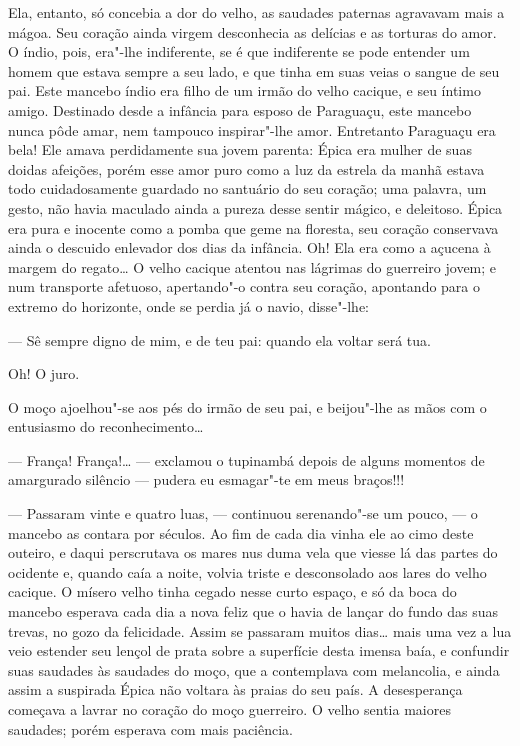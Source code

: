 Ela, entanto, só concebia a dor do velho, as saudades paternas agravavam
mais a mágoa. Seu coração ainda virgem desconhecia as delícias e as
torturas do amor. O índio, pois, era"-lhe indiferente, se é que
indiferente se pode entender um homem que estava sempre a seu lado, e
que tinha em suas veias o sangue de seu pai. Este mancebo índio era
filho de um irmão do velho cacique, e seu íntimo amigo. Destinado desde
a infância para esposo de Paraguaçu, este mancebo nunca pôde amar, nem
tampouco inspirar"-lhe amor. Entretanto Paraguaçu era bela! Ele amava
perdidamente sua jovem parenta: Épica era mulher de suas doidas
afeições, porém esse amor puro como a luz da estrela da manhã estava
todo cuidadosamente guardado no santuário do seu coração; uma palavra,
um gesto, não havia maculado ainda a pureza desse sentir mágico, e
deleitoso. Épica era pura e inocente como a pomba que geme na floresta,
seu coração conservava ainda o descuido enlevador dos dias da infância.
Oh! Ela era como a açucena à margem do regato\ldots{} O velho cacique atentou
nas lágrimas do guerreiro jovem; e num transporte afetuoso, apertando"-o
contra seu coração, apontando para o extremo do horizonte, onde se
perdia já o navio, disse"-lhe:

--- Sê sempre digno de mim, e de teu pai: quando ela voltar será tua.

Oh! O juro.

O moço ajoelhou"-se aos pés do irmão de seu pai, e beijou"-lhe as mãos com
o entusiasmo do reconhecimento\ldots{}

--- França! França!\ldots{} --- exclamou o tupinambá depois de alguns momentos
de amargurado silêncio --- pudera eu esmagar"-te em meus braços!!!

--- Passaram vinte e quatro luas, --- continuou serenando"-se um pouco, ---
o mancebo as contara por séculos. Ao fim de cada dia vinha ele ao cimo
deste outeiro, e daqui perscrutava os mares nus duma vela que viesse lá
das partes do ocidente e, quando caía a noite, volvia triste e
desconsolado aos lares do velho cacique. O mísero velho tinha cegado
nesse curto espaço, e só da boca do mancebo esperava cada dia a nova
feliz que o havia de lançar do fundo das suas trevas, no gozo da
felicidade. Assim se passaram muitos dias\ldots{} mais uma vez a lua veio
estender seu lençol de prata sobre a superfície desta imensa baía, e
confundir suas saudades às saudades do moço, que a contemplava com
melancolia, e ainda assim a suspirada Épica não voltara às praias do seu
país. A desesperança começava a lavrar no coração do moço guerreiro. O
velho sentia maiores saudades; porém esperava com mais paciência.

